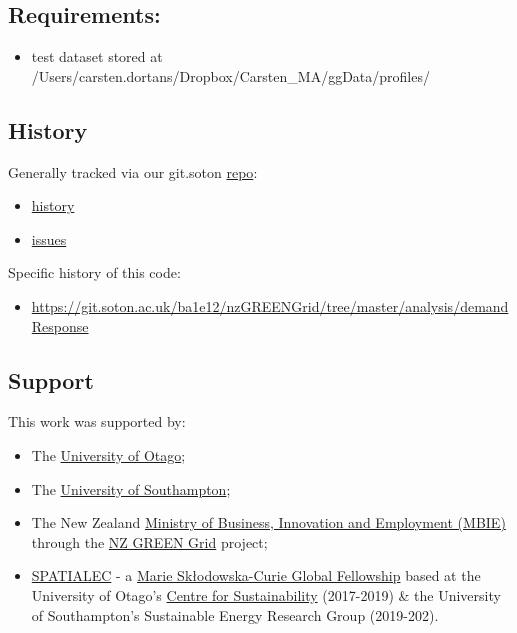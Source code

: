 \documentclass[]{article}
\providecommand{\tightlist}{%
  \setlength{\itemsep}{0pt}\setlength{\parskip}{0pt}}
\begin{document}
\subsection{Requirements:}\label{requirements}

\begin{itemize}
\tightlist
\item
  test dataset stored at
  /Users/carsten.dortans/Dropbox/Carsten\_MA/ggData/profiles/
\end{itemize}

\subsection{History}\label{history}

Generally tracked via our git.soton
\href{https://git.soton.ac.uk/ba1e12/nzGREENGrid}{repo}:

\begin{itemize}
\tightlist
\item
  \href{https://git.soton.ac.uk/ba1e12/nzGREENGrid/commits/master}{history}
\item
  \href{https://git.soton.ac.uk/ba1e12/nzGREENGrid/issues}{issues}
\end{itemize}

Specific history of this code:

\begin{itemize}
\tightlist
\item
  \url{https://git.soton.ac.uk/ba1e12/nzGREENGrid/tree/master/analysis/demandResponse}
\end{itemize}

\subsection{Support}\label{support}

This work was supported by:

\begin{itemize}
\tightlist
\item
  The \href{https://www.otago.ac.nz/}{University of Otago};
\item
  The \href{https://www.southampton.ac.uk/}{University of Southampton};
\item
  The New Zealand \href{http://www.mbie.govt.nz/}{Ministry of Business,
  Innovation and Employment (MBIE)} through the
  \href{https://www.otago.ac.nz/centre-sustainability/research/energy/otago050285.html}{NZ
  GREEN Grid} project;
\item
  \href{http://www.energy.soton.ac.uk/tag/spatialec/}{SPATIALEC} - a
  \href{http://ec.europa.eu/research/mariecurieactions/about-msca/actions/if/index_en.htm}{Marie
  Skłodowska-Curie Global Fellowship} based at the University of Otago's
  \href{http://www.otago.ac.nz/centre-sustainability/staff/otago673896.html}{Centre
  for Sustainability} (2017-2019) \& the University of Southampton's
  Sustainable Energy Research Group (2019-202).
\end{itemize}
\end{document}
